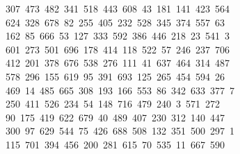 \begin{tabbing}
\>\ 307\ 473\ 482\ 341\ 518\ 443\ 608\ 43\ 181\ 141\ 423\ 564\ \\[0pt]
\ 624\ 328\ 678\ 82\ 255\ 405\ 232\ 528\ 345\ 374\ 557\ 63\\[0pt]
\ 162\ 85\ 666\ 53\ 127\ 333\ 592\ 386\ 446\ 218\ 23\ 541\ 3\\[0pt]
\ 601\ 273\ 501\ 696\ 178\ 414\ 118\ 522\ 57\ 246\ 237\ 706\\[0pt]
\>\ 412\ 201\ 378\ 676\ 538\ 276\ 111\ 41\ 637\ 464\ 314\ 487\ \\[0pt]
\ 578\ 296\ 155\ 619\ 95\ 391\ 693\ 125\ 265\ 454\ 594\ 26\\[0pt]
\>\ 469\ 14\ 485\ 665\ 308\ 193\ 166\ 553\ 86\ 342\ 633\ 377\ 7\\[0pt]
\ 250\ 411\ 526\ 234\ 54\ 148\ 716\ 479\ 240\ 3\ 571\ 272\ \\[0pt]
\ 90\ 175\ 419\ 622\ 679\ 40\ 489\ 407\ 230\ 312\ 140\ 447\\[0pt]
\>\ 300\ 97\ 629\ 544\ 75\ 426\ 688\ 508\ 132\ 351\ 500\ 297\ 1\\[0pt]
\ 115\ 701\ 394\ 456\ 200\ 281\ 615\ 70\ 535\ 11\ 667\ 590\\[0pt]

\end{tabbing}
